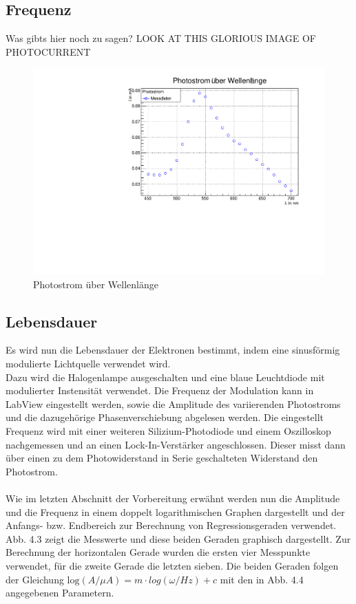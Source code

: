 \FloatBarrier
\subsection{Frequenz}
Was gibts hier noch zu sagen?
LOOK AT THIS GLORIOUS IMAGE OF PHOTOCURRENT
\begin{figure}
\label{A3}
\centering
\includegraphics[scale=0.5]{../A3/A3.pdf}
\caption{Photostrom über Wellenlänge}
\end{figure}


\FloatBarrier
\subsection{Lebensdauer}

Es wird nun die Lebensdauer der Elektronen bestimmt, indem eine sinusförmig modulierte Lichtquelle verwendet wird. \\
Dazu wird die Halogenlampe ausgeschalten und eine blaue Leuchtdiode mit modulierter Instensität verwendet. Die Frequenz der Modulation kann in LabView eingestellt werden, sowie die Amplitude des variierenden Photostroms und die dazugehörige Phasenverschiebung abgelesen werden. Die eingestellt Frequenz wird mit einer weiteren Silizium-Photodiode und einem Oszilloskop nachgemessen und an einen Lock-In-Verstärker angeschlossen. Dieser misst dann über einen zu dem Photowiderstand in Serie geschalteten Widerstand den Photostrom. \\
\\
Wie im letzten Abschnitt der Vorbereitung erwähnt werden nun die Amplitude und die Frequenz in einem doppelt logarithmischen Graphen dargestellt und der Anfangs- bzw. Endbereich zur Berechnung von Regressionsgeraden verwendet. \\
Abb. 4.3 zeigt die Messwerte und diese beiden Geraden graphisch dargestellt. Zur Berechnung der horizontalen Gerade wurden die ersten vier Messpunkte verwendet, für die zweite Gerade die letzten sieben. 
Die beiden Geraden folgen der Gleichung $\mathrm{log} (A / \mu A) = m \cdot log(\omega / Hz) + c$ mit den in Abb. 4.4 angegebenen Parametern. \\

